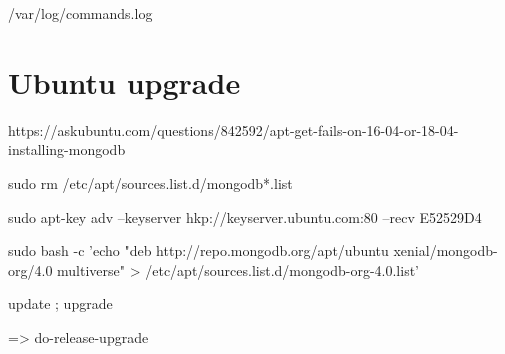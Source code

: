 /var/log/commands.log



\section*{Ubuntu upgrade}

https://askubuntu.com/questions/842592/apt-get-fails-on-16-04-or-18-04-installing-mongodb

sudo rm /etc/apt/sources.list.d/mongodb*.list

sudo apt-key adv --keyserver hkp://keyserver.ubuntu.com:80 --recv E52529D4

sudo bash -c 'echo "deb http://repo.mongodb.org/apt/ubuntu xenial/mongodb-org/4.0 multiverse" > /etc/apt/sources.list.d/mongodb-org-4.0.list'

update ; upgrade 

=> do-release-upgrade












